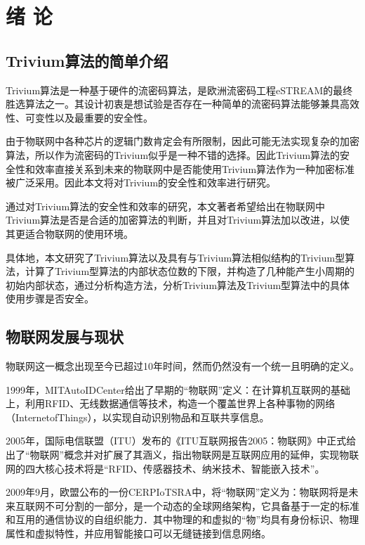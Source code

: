 
\chapter{绪 \quad 论}
\label{chap:introduction}

\section{Trivium算法的简单介绍}

Trivium算法是一种基于硬件的流密码算法，是欧洲流密码工程eSTREAM的最终胜选算法之一\supercite{canniere2008estream}。其设计初衷是想试验是否存在一种简单的流密码算法能够兼具高效性、可变性以及最重要的安全性。

由于物联网中各种芯片的逻辑门数肯定会有所限制，因此可能无法实现复杂的加密算法，所以作为流密码的Trivium似乎是一种不错的选择。因此Trivium算法的安全性和效率直接关系到未来的物联网中是否能使用Trivium算法作为一种加密标准被广泛采用。因此本文将对Trivium的安全性和效率进行研究。

通过对Trivium算法的安全性和效率的研究，本文著者希望给出在物联网中Trivium算法是否是合适的加密算法的判断，并且对Trivium算法加以改进，以使其更适合物联网的使用环境。

具体地，本文研究了Trivium算法以及具有与Trivium算法相似结构的Trivium型算法，计算了Trivium型算法的内部状态位数的下限，并构造了几种能产生小周期的初始内部状态，通过分析构造方法，分析Trivium算法及Trivium型算法中的具体使用步骤是否安全。


\section{物联网发展与现状}

物联网这一概念出现至今已超过10年时间，然而仍然没有一个统一且明确的定义。

1999年，MITAutoIDCenter给出了早期的“物联网”定义：在计算机互联网的基础上，利用RFID、无线数据通信等技术，构造一个覆盖世界上各种事物的网络（InternetofThings），以实现自动识别物品和互联共享信息\parencite{sarma2000networked}。

2005年，国际电信联盟（ITU）发布的《ITU互联网报告2005：物联网》中正式给出了“物联网”概念并对扩展了其涵义，指出物联网是互联网应用的延伸，实现物联网的四大核心技术将是“RFID、传感器技术、纳米技术、智能嵌入技术”\parencite{strategy2005itu}。

2009年9月，欧盟公布的一份CERPIoTSRA中，将“物联网”定义为：物联网将是未来互联网不可分割的一部分，是一个动态的全球网络架构，它具备基于一定的标准和互用的通信协议的自组织能力．其中物理的和虚拟的“物”均具有身份标识、物理属性和虚拟特性，并应用智能接口可以无缝链接到信息网络\parencite{宁焕生2010全球物联网发展及中国物联网建设若干思考}。


